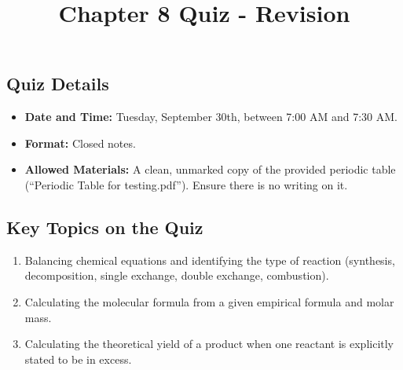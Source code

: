 \documentclass{article}
\title{Chapter 8 Quiz - Revision}
\author{}
\date{}
\begin{document}
\maketitle %

\hrulefill
\subsection*{Quiz Details}
\begin{itemize}[itemsep=5pt] %
    \item \textbf{Date and Time:} Tuesday, September 30th, between 7:00 AM and 7:30 AM.
    \item \textbf{Format:} Closed notes.
    \item \textbf{Allowed Materials:} A clean, unmarked copy of the provided periodic table (``Periodic Table for testing.pdf''). Ensure there is no writing on it.
\end{itemize}
\hrulefill
\subsection*{Key Topics on the Quiz}
\begin{enumerate}[itemsep=5pt]
    \item Balancing chemical equations and identifying the type of reaction (synthesis, decomposition, single exchange, double exchange, combustion).
    \item Calculating the molecular formula from a given empirical formula and molar mass.
    \item Calculating the theoretical yield of a product when one reactant is explicitly stated to be in excess.
\end{enumerate}
\hrulefill
\bigskip %

\end{document}
